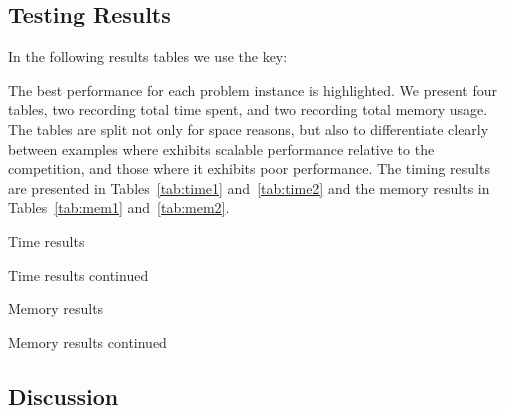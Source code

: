 \subsection{Testing Results}

In the following results tables we use the key:


The best performance for each problem instance is highlighted. We present four
tables, two recording total time spent, and two recording total memory usage.
The tables are split not only for space reasons, but also to differentiate
clearly between examples where \penrose{} exhibits scalable performance
relative to the competition, and those where it exhibits poor performance. The
timing results are presented in Tables~\ref{tab:time1} and~\ref{tab:time2} and
the memory results in Tables~\ref{tab:mem1} and~\ref{tab:mem2}.

\begin{table}
\caption{Time results}
\label{tab:time1}
\centering
\resizebox{0.95\linewidth}{!}{%

}
\end{table}

\begin{table}
\caption{Time results continued}
\label{tab:time2}
\centering
\resizebox{0.95\linewidth}{!}{%

}
\end{table}

\begin{table}
\caption{Memory results}
\label{tab:mem1}
\centering
\resizebox{0.95\linewidth}{!}{%

}
\end{table}

\begin{table}
\caption{Memory results continued}
\label{tab:mem2}
\centering
\resizebox{0.95\linewidth}{!}{%

}
\end{table}

\subsection{Discussion}

